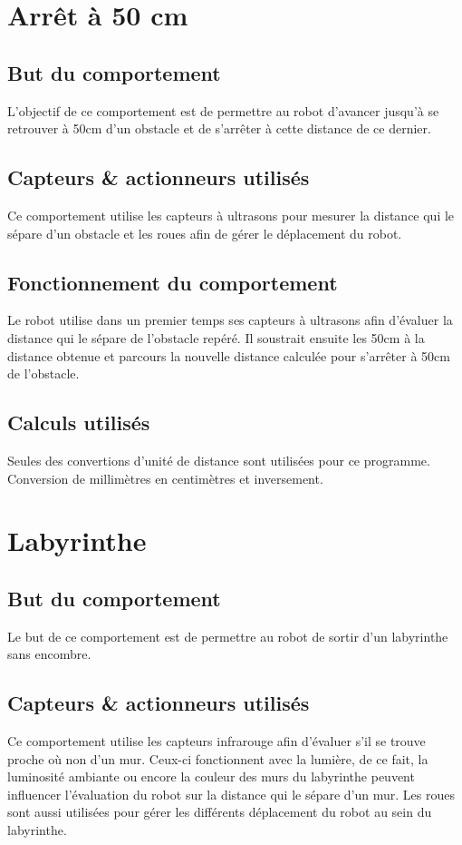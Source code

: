 \documentclass[11pt]{article} %
\begin{document}
\section{Arrêt à 50 cm}
        \subsection{But du comportement}
		L'objectif de ce comportement est de permettre au robot d'avancer jusqu'à se retrouver à 50cm d'un obstacle et de s'arrêter à cette distance de ce dernier.
        \subsection{Capteurs \& actionneurs utilisés}
		Ce comportement utilise les capteurs à ultrasons pour mesurer la distance qui le sépare d'un obstacle et les roues afin de gérer le déplacement du robot.
        \subsection{Fonctionnement du comportement}
		Le robot utilise dans un premier temps ses capteurs à ultrasons afin d'évaluer la distance qui le sépare de l'obstacle repéré. Il soustrait ensuite les 50cm à la distance obtenue et parcours la nouvelle distance calculée pour s'arrêter à 50cm de l'obstacle.
        \subsection{Calculs utilisés}
		Seules des convertions d'unité de distance sont utilisées pour ce programme. Conversion de millimètres en centimètres et inversement.
\pagebreak
	\section{Labyrinthe}
        	\subsection{But du comportement}
			Le but de ce comportement est de permettre au robot de sortir d'un labyrinthe sans encombre.
        	\subsection{Capteurs \& actionneurs utilisés}
			Ce comportement utilise les capteurs infrarouge afin d'évaluer s'il se trouve proche où non d'un mur. Ceux-ci fonctionnent avec la lumière, de ce fait, la luminosité ambiante ou encore la couleur des murs du labyrinthe peuvent influencer l'évaluation du robot sur la distance qui le sépare d'un mur. Les roues sont aussi utilisées pour gérer les différents déplacement du robot au sein du labyrinthe.
\end{document}
